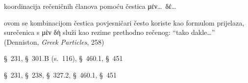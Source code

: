 \begin{description}[noitemsep]
\item[μέχρι μὲν\dots\ ἐκ τούτου δὲ\dots] koordinacija rečeničnih članova pomoću čestica μέν\dots\ δέ\dots
\item[μὲν δὴ] ovom se kombinacijom čestica povjesničari često koriste kao formulom prijelaza, surečenica s μὲν δὴ služi kao rezime prethodno rečenog: ``tako dakle\dots'' (Denniston, \textit{Greek Particles}, 258)%
\item[πράττουσιν] §~231, §~301.B (s.~116), §~460.1, §~451
\item[ἐξέρχονται] §~231, §~238, §~327.2, §~460.1, §~451

\end{description}


